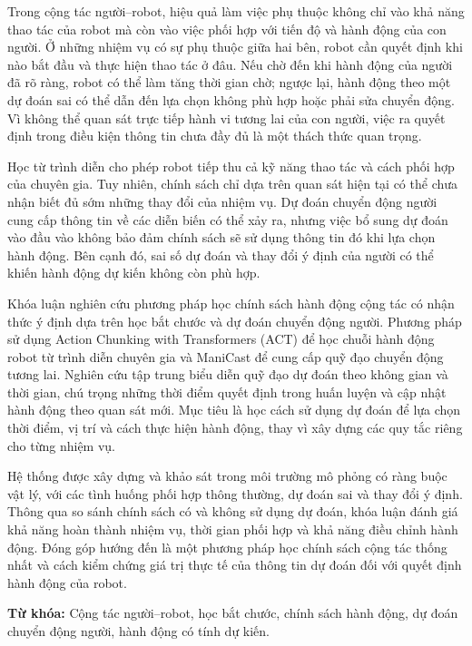 
Trong cộng tác người--robot, hiệu quả làm việc phụ thuộc không chỉ vào khả năng thao tác của robot mà còn vào việc phối hợp với tiến độ và hành động của con người. Ở những nhiệm vụ có sự phụ thuộc giữa hai bên, robot cần quyết định khi nào bắt đầu và thực hiện thao tác ở đâu. Nếu chờ đến khi hành động của người đã rõ ràng, robot có thể làm tăng thời gian chờ; ngược lại, hành động theo một dự đoán sai có thể dẫn đến lựa chọn không phù hợp hoặc phải sửa chuyển động. Vì không thể quan sát trực tiếp hành vi tương lai của con người, việc ra quyết định trong điều kiện thông tin chưa đầy đủ là một thách thức quan trọng.

Học từ trình diễn cho phép robot tiếp thu cả kỹ năng thao tác và cách phối hợp của chuyên gia. Tuy nhiên, chính sách chỉ dựa trên quan sát hiện tại có thể chưa nhận biết đủ sớm những thay đổi của nhiệm vụ. Dự đoán chuyển động người cung cấp thông tin về các diễn biến có thể xảy ra, nhưng việc bổ sung dự đoán vào đầu vào không bảo đảm chính sách sẽ sử dụng thông tin đó khi lựa chọn hành động. Bên cạnh đó, sai số dự đoán và thay đổi ý định của người có thể khiến hành động dự kiến không còn phù hợp.

Khóa luận nghiên cứu phương pháp học chính sách hành động cộng tác có nhận thức ý định dựa trên học bắt chước và dự đoán chuyển động người. Phương pháp sử dụng Action Chunking with Transformers (ACT) để học chuỗi hành động robot từ trình diễn chuyên gia và ManiCast để cung cấp quỹ đạo chuyển động tương lai. Nghiên cứu tập trung biểu diễn quỹ đạo dự đoán theo không gian và thời gian, chú trọng những thời điểm quyết định trong huấn luyện và cập nhật hành động theo quan sát mới. Mục tiêu là học cách sử dụng dự đoán để lựa chọn thời điểm, vị trí và cách thực hiện hành động, thay vì xây dựng các quy tắc riêng cho từng nhiệm vụ.

Hệ thống được xây dựng và khảo sát trong môi trường mô phỏng có ràng buộc vật lý, với các tình huống phối hợp thông thường, dự đoán sai và thay đổi ý định. Thông qua so sánh chính sách có và không sử dụng dự đoán, khóa luận đánh giá khả năng hoàn thành nhiệm vụ, thời gian phối hợp và khả năng điều chỉnh hành động. Đóng góp hướng đến là một phương pháp học chính sách cộng tác thống nhất và cách kiểm chứng giá trị thực tế của thông tin dự đoán đối với quyết định hành động của robot.

\noindent\textbf{Từ khóa:} Cộng tác người--robot, học bắt chước, chính sách hành động, dự đoán chuyển động người, hành động có tính dự kiến.
